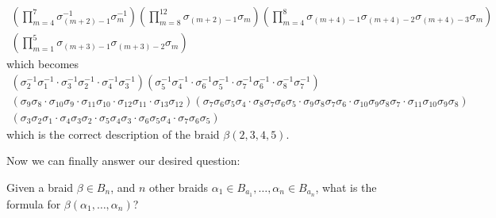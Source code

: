 \begin{example}
\begin{gather*}
        \left( \prod_{m = 4}^{7}\sigma^{-1}_{(m+2)-1}\sigma_m^{-1} \right)
        \left( \prod_{m = 8}^{12}\sigma_{(m+2)-1}\sigma_m \right)
        \left( \prod_{m = 4}^{8}\sigma_{(m+4)-1}\sigma_{(m+4)-2}\sigma_{(m+4)-3}\sigma_{m} \right)
        \\
        \left( \prod_{m = 1}^{5}\sigma_{(m+3)-1}\sigma_{(m+3)-2}\sigma_m \right)
    \end{gather*}
    which becomes 
    \begin{gather*}
        (\sigma^{-1}_2\sigma^{-1}_1 \cdot \sigma^{-1}_3\sigma^{-1}_2 \cdot \sigma^{-1}_4\sigma^{-1}_3)
        (\sigma^{-1}_5\sigma^{-1}_4\cdot \sigma^{-1}_6\sigma^{-1}_5 \cdot \sigma^{-1}_7\sigma^{-1}_6 \cdot \sigma^{-1}_8\sigma^{-1}_7)
        \\
        (\sigma_9\sigma_8 \cdot \sigma_{10}\sigma_9 \cdot \sigma_{11}\sigma_{10} \cdot \sigma_{12}\sigma_{11} \cdot \sigma_{13}\sigma_{12})
        (\sigma_7\sigma_6\sigma_5\sigma_4 \cdot \sigma_8\sigma_7\sigma_6\sigma_5 \cdot \sigma_9\sigma_8\sigma_7\sigma_6 \cdot 
        \sigma_{10}\sigma_9\sigma_8\sigma_7\cdot \sigma_{11}\sigma_{10}\sigma_9\sigma_8)
        \\
        (\sigma_3\sigma_2\sigma_1 \cdot \sigma_4\sigma_3\sigma_2 \cdot \sigma_5\sigma_4\sigma_3 \cdot \sigma_6\sigma_5\sigma_4 \cdot \sigma_7\sigma_6\sigma_5)
    \end{gather*}
    which is the correct description of the braid $\beta(2,3,4,5)$. 
\end{example}

Now we can finally answer our desired question: 
\begin{center}
    Given a braid $\beta \in B_n$, and $n$ other braids $\alpha_1 \in B_{a_1}, \dots, \alpha_n \in B_{a_n}$, 
    what is the formula for $\beta(\alpha_1, \dots, \alpha_n)$? 
\end{center}

